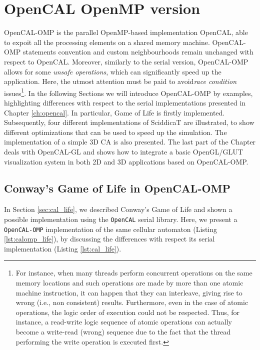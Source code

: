 \chapter{OpenCAL OpenMP version}\label{ch:opencal-omp}

OpenCAL-OMP is the parallel OpenMP-based implementation OpenCAL, able
to expoit all the processing elements on a shared memory
machine. OpenCAL-OMP statements convention and custom neighbourhoods
remain unchanged with respect to OpenCAL. Moreover, similarly to the
serial version, OpenCAL-OMP allows for some \emph{unsafe operations},
which can significantly speed up the application. Here, the utmost
attention must be paid to avoid\textsl{race condition}
issues\footnote{For instance, when many threads perform concurrent
  operations on the same memory locations and such operations are made
  by more than one atomic machine instruction, it can happen that they
  can interleave, giving rise to wrong (i.e., non consistent)
  results. Furthermore, even in the case of atomic operations, the
  logic order of execution could not be respected. Thus, for instance,
  a read-write logic sequence of atomic operations can actually become
  a write-read (wrong) sequence due to the fact that the thread
  performing the write operation is executed first.}. In the following
Sections we will introduce OpenCAL-OMP by examples, highlighting
differences with respect to the serial implementations presented in
Chapter \ref{ch:opencal}. In particular, Game of Life is firstly
implemented. Subsequently, four different implementations of SciddicaT
are illustrated, to show different optimizations that can be used to
speed up the simulation. The implementation of a simple 3D CA is also
presented. The last part of the Chapter deals with OpenCAL-GL and
shows how to integrate a basic OpenGL/GLUT visualization system in
both 2D and 3D applications based on OpenCAL-OMP.


\section{Conway's Game of Life in OpenCAL-OMP}

In Section \ref{sec:cal_life}, we described Conway's Game of Life and
shown a possible implementation using the \verb'OpenCAL' serial
library. Here, we present a \verb'OpenCAL-OMP' implementation of the
same cellular automaton (Listing \ref{lst:calomp_life}), by discussing
the differences with respect its serial implementation (Listing
\ref{lst:cal_life}).


